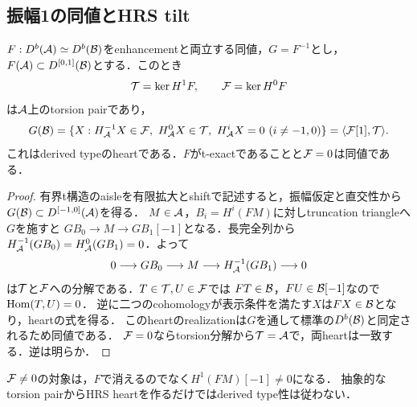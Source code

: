 \subsection{振幅1の同値とHRS tilt}
\begin{proposition}\label{prop:hrs}
$F:D^b(\mathcal A)\simeq D^b(\mathcal B)$をenhancementと両立する同値，$G=F^{-1}$とし，
$F(\mathcal A)\subset D^{[0,1]}(\mathcal B)$とする．このとき
\[
\mathcal T=\ker H^1F,\qquad\mathcal F=\ker H^0F
\]
は$\mathcal A$上のtorsion pairであり，
\[
G(\cB)=\{X:H^{-1}_{\cA}X\in\cF,\ H^0_{\cA}X\in\cT,
\ H^i_{\cA}X=0\ (i\ne-1,0)\}=\langle\cF[1],\cT\rangle.
\]
これはderived typeのheartである．$F$がt-exactであることと$\mathcal F=0$は同値である．
\end{proposition}
\begin{proof}
有界t構造のaisleを有限拡大とshiftで記述すると，振幅仮定と直交性から
$G(\mathcal B)\subset D^{[-1,0]}(\mathcal A)$を得る．
$M\in\mathcal A$，$B_i=H^i(FM)$に対しtruncation triangleへ$G$を施すと
$GB_0\to M\to GB_1[-1]$となる．長完全列から
$H^{-1}_{\mathcal A}(GB_0)=H^0_{\mathcal A}(GB_1)=0$．よって
\[
0\longrightarrow GB_0\longrightarrow M\longrightarrow
H^{-1}_{\mathcal A}(GB_1)\longrightarrow0
\]
は$\mathcal T$と$\mathcal F$への分解である．$T\in\mathcal T,U\in\mathcal F$では
$FT\in\mathcal B$，$FU\in\mathcal B[-1]$なので$\operatorname{Hom}(T,U)=0$．
逆に二つのcohomologyが表示条件を満たす$X$は$FX\in\mathcal B$となり，heartの式を得る．
このheartのrealizationは$G$を通して標準の$D^b(\mathcal B)$と同定されるため同値である．
$\mathcal F=0$ならtorsion分解から$\mathcal T=\mathcal A$で，両heartは一致する．逆は明らか．
\end{proof}
\begin{remark}
$\mathcal F\ne0$の対象は，$F$で消えるのでなく$H^1(FM)[-1]\ne0$になる．
抽象的なtorsion pairからHRS heartを作るだけではderived type性は従わない\cite{CHZ}．
\end{remark}


